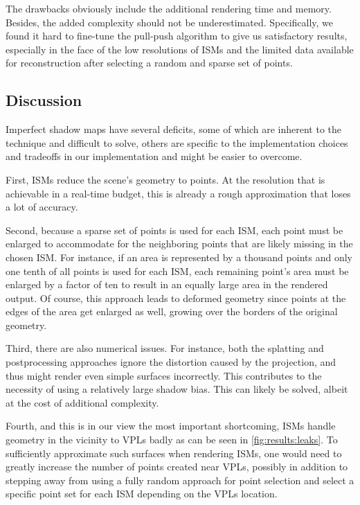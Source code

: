 The drawbacks obviously include the additional rendering time and memory. Besides, the added complexity should not be underestimated. Specifically, we found it hard to fine-tune the pull-push algorithm to give us satisfactory results, especially in the face of the low resolutions of ISMs and the limited data available for reconstruction after selecting a random and sparse set of points.




\subsection{Discussion}
\label{sec:results:ism:discussion}

Imperfect shadow maps have several deficits, some of which are inherent to the technique and difficult to solve, others are specific to the implementation choices and tradeoffs in our implementation and might be easier to overcome.

First, ISMs reduce the scene's geometry to points. At the resolution that is achievable in a real-time budget, this is already a rough approximation that loses a lot of accuracy.

Second, because a sparse set of points is used for each ISM, each point must be enlarged to accommodate for the neighboring points that are likely missing in the chosen ISM. For instance, if an area is represented by a thousand points and only one tenth of all points is used for each ISM, each remaining point's area must be enlarged by a factor of ten to result in an equally large area in the rendered output. Of course, this approach leads to deformed geometry since points at the edges of the area get enlarged as well, growing over the borders of the original geometry.

Third, there are also numerical issues. For instance, both the splatting and postprocessing approaches ignore the distortion caused by the projection, and thus might render even simple surfaces incorrectly. This contributes to the necessity of using a relatively large shadow bias. This can likely be solved, albeit at the cost of additional complexity.

Fourth, and this is in our view the most important shortcoming, ISMs handle geometry in the vicinity to VPLs badly as can be seen in \cref{fig:results:leaks}. To sufficiently approximate such surfaces when rendering ISMs, one would need to greatly increase the number of points created near VPLs, possibly in addition to stepping away from using a fully random approach for point selection and select a specific point set for each ISM depending on the VPLs location.

